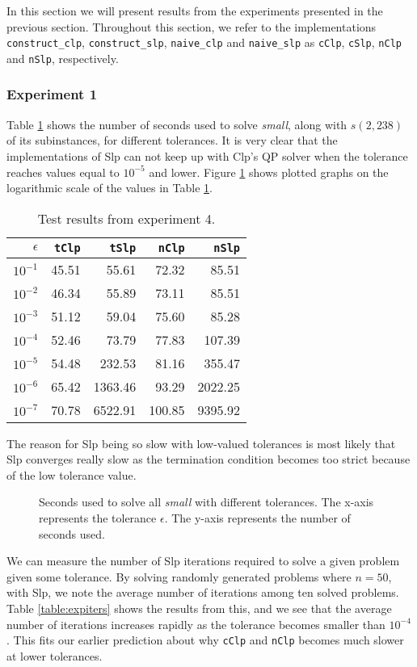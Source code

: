 In this section we will present results from the experiments presented in the
previous section. Throughout this section, we refer to the implementations
\texttt{construct\_clp}, \texttt{construct\_slp}, \texttt{naive\_clp} and
\texttt{naive\_slp} as \texttt{cClp}, \texttt{cSlp}, \texttt{nClp} and
\texttt{nSlp}, respectively.

\subsubsection{Experiment 1}
Table \ref{table:expone} shows the number of seconds
used to solve \textit{small}, along with $s(2, 238)$ of its subinstances, for
different tolerances.
It is very clear that the implementations of Slp can not
keep up with Clp's QP solver when the tolerance reaches values equal to
$10^{-5}$ and lower.
Figure \ref{fig:smalltolerance} shows plotted graphs on the logarithmic scale
of the values in Table \ref{table:expone}.

\begin{table}[ht!]
\centering
\caption{Test results from experiment 4.}
\begin{tabular}{rrrrr}
$\epsilon$ & \texttt{tClp} & \texttt{tSlp} & \texttt{nClp} & \texttt{nSlp} \\ \hline
$10^{-1}$ & 45.51 & 55.61 & 72.32 & 85.51 \\
$10^{-2}$ & 46.34 & 55.89 & 73.11 & 85.51 \\
$10^{-3}$ & 51.12 & 59.04 & 75.60 & 85.28 \\
$10^{-4}$ & 52.46 & 73.79 & 77.83 & 107.39 \\
$10^{-5}$ & 54.48 & 232.53 & 81.16 & 355.47 \\
$10^{-6}$ & 65.42 & 1363.46 & 93.29 & 2022.25 \\
$10^{-7}$ & 70.78 & 6522.91 & 100.85 & 9395.92
\end{tabular}
\label{table:expone}
\end{table}

The reason for Slp being so slow with low-valued tolerances is most likely that
Slp converges really slow as the termination condition becomes too strict
because of the low tolerance value.
\begin{figure}[ht!]
    \centering
    
    \caption{Seconds used to solve all \textit{small} with different
             tolerances.
             The x-axis represents the tolerance $\epsilon$.
             The y-axis represents the number of seconds used.}
    \label{fig:smalltolerance}
\end{figure}
We can measure the number of Slp iterations required to solve a given problem
given some tolerance. By solving randomly generated problems where $n = 50$,
with Slp, we note the average number of iterations among ten solved
problems. Table \ref{table:expiters} shows the results from this, and we see
that the average number of iterations increases rapidly as the tolerance
becomes smaller than $10^{-4}$. This fits our earlier prediction about why
\texttt{cClp} and \texttt{nClp} becomes much slower at lower tolerances.

